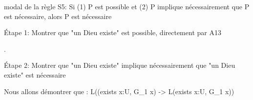 \documentclass[10pt]{report}
\begin{document}
\begin{coqdoccode}
\begin{coqdoccomment}
modal\coqdocindent{0.50em}
de\coqdocindent{0.50em}
la\coqdocindent{0.50em}
règle\coqdocindent{0.50em}
S5:\coqdoceol
\coqdocindent{2.50em}
Si\coqdocindent{0.50em}
(1)\coqdocindent{0.50em}
P\coqdocindent{0.50em}
est\coqdocindent{0.50em}
possible\coqdocindent{0.50em}
et\coqdocindent{0.50em}
(2)\coqdocindent{0.50em}
P\coqdocindent{0.50em}
implique\coqdocindent{0.50em}
nécessairement\coqdocindent{0.50em}
que\coqdocindent{0.50em}
P\coqdocindent{0.50em}
est\coqdocindent{0.50em}
nécessaire,\coqdoceol
\coqdocindent{2.50em}
alors\coqdocindent{0.50em}
P\coqdocindent{0.50em}
est\coqdocindent{0.50em}
nécessaire\coqdocindent{0.50em}
\end{coqdoccomment}
\coqdoceol
\coqdocemptyline
\coqdocindent{1.00em}
\begin{coqdoccomment}
\coqdocindent{0.50em}
Étape\coqdocindent{0.50em}
1:\coqdocindent{0.50em}
Montrer\coqdocindent{0.50em}
que\coqdocindent{0.50em}
"un\coqdocindent{0.50em}
Dieu\coqdocindent{0.50em}
existe"\coqdocindent{0.50em}
est\coqdocindent{0.50em}
possible,\coqdocindent{0.50em}
directement\coqdocindent{0.50em}
par\coqdocindent{0.50em}
A13\coqdocindent{0.50em}
\end{coqdoccomment}
\coqdoceol
\coqdocindent{1.00em}
    .\coqdoceol
\coqdocemptyline
\coqdocindent{1.00em}
\begin{coqdoccomment}
\coqdocindent{0.50em}
Étape\coqdocindent{0.50em}
2:\coqdocindent{0.50em}
Montrer\coqdocindent{0.50em}
que\coqdocindent{0.50em}
"un\coqdocindent{0.50em}
Dieu\coqdocindent{0.50em}
existe"\coqdocindent{0.50em}
implique\coqdocindent{0.50em}
nécessairement\coqdocindent{0.50em}
que\coqdocindent{0.50em}
"un\coqdocindent{0.50em}
Dieu\coqdocindent{0.50em}
existe"\coqdocindent{0.50em}
est\coqdocindent{0.50em}
nécessaire\coqdocindent{0.50em}
\end{coqdoccomment}
\coqdoceol
\coqdocindent{1.00em}
\begin{coqdoccomment}
\coqdocindent{0.50em}
Nous\coqdocindent{0.50em}
allons\coqdocindent{0.50em}
démontrer\coqdocindent{0.50em}
que\coqdocindent{0.50em}
:\coqdocindent{0.50em}
L((exists\coqdocindent{0.50em}
x:U,\coqdocindent{0.50em}
G\_1\coqdocindent{0.50em}
x)\coqdocindent{0.50em}
->\coqdocindent{0.50em}
L(exists\coqdocindent{0.50em}
x:U,\coqdocindent{0.50em}
G\_1\coqdocindent{0.50em}
x))\coqdocindent{0.50em}
\end{coqdoccomment}
\coqdoceol
\coqdocemptyline
\coqdocindent{1.00em}
\begin{coqdoccomment}

\end{coqdoccomment}
\end{coqdoccode}
\end{document}
